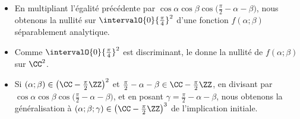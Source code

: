 \begin{example}
\begin{itemize}
    	\item En multipliant l'égalité précédente par 
		$\cos \alpha \cos \beta \cos \big( \frac{\pi}{2} - \alpha - \beta \big)$,
		nous obtenons la nullité sur $\intervalO{0}{\frac{\pi}{4}}^2$ d'une fonction $f(\alpha ; \beta)$ séparablement analytique.


    	\item Comme $\intervalO{0}{\frac{\pi}{4}}^2$ est discriminant, le  donne la nullité de $f(\alpha ; \beta)$ sur $\CC^2$.


    	\item Si
		$(\alpha ; \beta) \in \big( \CC - \frac{\pi}{2} \ZZ \big)^2$
		et
		$\frac{\pi}{2} - \alpha - \beta \in \CC - \frac{\pi}{2} \ZZ$,
		en divisant par
		$\cos \alpha \cos \beta \cos \big( \frac{\pi}{2} - \alpha - \beta \big)$,
		et
		en posant $\gamma = \frac{\pi}{2} - \alpha - \beta$,
		nous obtenons la généralisation à $(\alpha ; \beta ; \gamma) \in \big( \CC - \frac{\pi}{2} \ZZ \big)^3$ de l'implication initiale.
    \end{itemize}
\end{example}